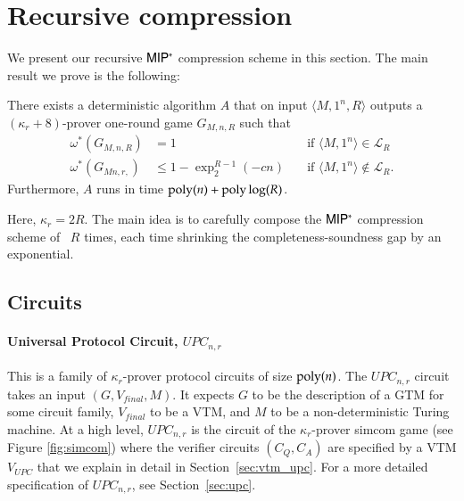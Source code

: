 
\section{Recursive compression}

We present our recursive ${\sf MIP^*}$ compression scheme in this section. The main result we prove is the following:

\begin{theorem}
	There exists a deterministic algorithm $A$ that on input $\langle M, 1^n, R \rangle$ outputs a $(\kappa_r + 8)$-prover one-round game $G_{M,n,R}$ such that 
\begin{align*}
		\omega^*(G_{M,n,R}) &= 1  \quad & \text{if } \langle M,1^n \rangle\in \mathcal{L}_R \\
		\omega^*(G_{Mn,r,}) &\leq 1 - \exp^{R-1}_2(-cn) \quad &\text{if } \langle M,1^n \rangle\notin \mathcal{L}_R.
\end{align*}
Furthermore, $A$ runs in time $\operatorname{poly}(n) + \operatorname{poly}\log(R)$.	
\end{theorem}

Here, $\kappa_r = 2R$.  The main idea is to carefully compose the ${\sf MIP^*}$ compression scheme of~\cite{ji2016compression} $R$ times, each time shrinking the completeness-soundness gap by an exponential. 



\subsection{Circuits}
\label{sec:circuits}

\paragraph{Universal Protocol Circuit, $UPC_{n,r}$} %
This is a family of $\kappa_r$-prover protocol circuits of size $\operatorname{poly}(n)$. The $UPC_{n,r}$ circuit takes an input $(G,V_{final},M)$. It expects $G$ to be the description of a GTM for some circuit family, $V_{final}$ to be a VTM, and $M$ to be a non-deterministic Turing machine. At a high level, $UPC_{n,r}$ is the circuit of the $\kappa_r$-prover simcom game (see Figure \ref{fig:simcom}) where the verifier circuits $(C_Q,C_A)$ are specified by a VTM $V_{UPC}$ that we explain in detail in Section~\ref{sec:vtm_upc}. For a more detailed specification of $UPC_{n,r}$, see Section~\ref{sec:upc}.

